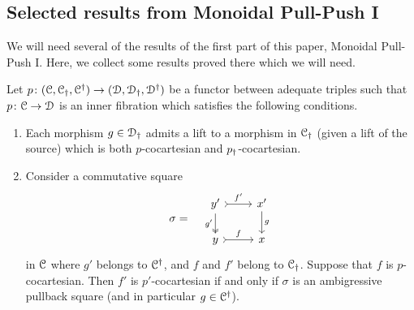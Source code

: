 \documentclass[main.tex]{subfiles}
\begin{document}
\subsection{Selected results from Monoidal Pull-Push I}
\label{ssc:selected_results_from_mppi}

We will need several of the results of the first part of this paper, Monoidal Pull-Push I. Here, we collect some results proved there which we will need.

\begin{theorem}
  \label{thm:old_barwick}
  Let $p\colon (\mathcal{C}, \mathcal{C}_{\dagger}, \mathcal{C}^{\dagger}) \to (\mathcal{D}, \mathcal{D}_{\dagger}, \mathcal{D}^{\dagger})$ be a functor between adequate triples such that $p\colon \mathcal{C} \to \mathcal{D}$ is an inner fibration which satisfies the following conditions.
  \begin{enumerate}
    \item Each morphism $g \in \mathcal{D}_{\dagger}$ admits a lift to a morphism in $\mathcal{C}_{\dagger}$ (given a lift of the source) which is both $p$-cocartesian and $p_{\dagger}$-cocartesian.

    \item Consider a commutative square
      \begin{equation*}
        \sigma = \quad
        \begin{tikzcd}
          y'
          \arrow[r, rightarrowtail, "f'"]
          \arrow[d, two heads, swap, "g'"]
          & x'
          \arrow[d, "g"]
          \\
          y
          \arrow[r, rightarrowtail, "f"]
          & x
        \end{tikzcd}
      \end{equation*}
      in $\mathcal{C}$ where $g'$ belongs to $\mathcal{C}^{\dagger}$, and $f$ and $f'$ belong to $\mathcal{C}_{\dagger}$. Suppose that $f$ is $p$-cocartesian. Then $f'$ is $p'$-cocartesian if and only if $\sigma$ is an ambigressive pullback square (and in particular $g \in \mathcal{C}^{\dagger}$).
  \end{enumerate}
\end{theorem}
\end{document}
